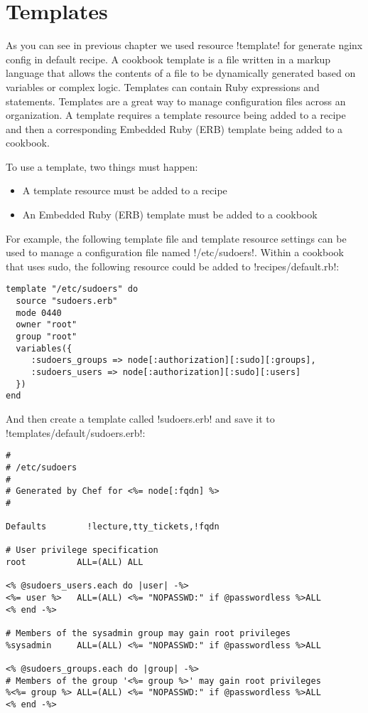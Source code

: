 \section{Templates}
\label{sec:cookbook-templates}

As you can see in previous chapter we used resource \inline!template! for generate nginx config in default recipe. A cookbook template is a file written in a markup language that allows the contents of a file to be dynamically generated based on variables or complex logic. Templates can contain Ruby expressions and statements. Templates are a great way to manage configuration files across an organization. A template requires a template resource being added to a recipe and then a corresponding Embedded Ruby (ERB) template being added to a cookbook.

To use a template, two things must happen:

\begin{itemize}
  \item A template resource must be added to a recipe
  \item An Embedded Ruby (ERB) template must be added to a cookbook
\end{itemize}

For example, the following template file and template resource settings can be used to manage a configuration file named \inline!/etc/sudoers!. Within a cookbook that uses sudo, the following resource could be added to \inline!recipes/default.rb!:

\begin{lstlisting}[label=lst:cookbook-templates1]
template "/etc/sudoers" do
  source "sudoers.erb"
  mode 0440
  owner "root"
  group "root"
  variables({
     :sudoers_groups => node[:authorization][:sudo][:groups],
     :sudoers_users => node[:authorization][:sudo][:users]
  })
end
\end{lstlisting}

And then create a template called \inline!sudoers.erb! and save it to \inline!templates/default/sudoers.erb!:

\begin{lstlisting}[label=lst:cookbook-templates2]
#
# /etc/sudoers
#
# Generated by Chef for <%= node[:fqdn] %>
#

Defaults        !lecture,tty_tickets,!fqdn

# User privilege specification
root          ALL=(ALL) ALL

<% @sudoers_users.each do |user| -%>
<%= user %>   ALL=(ALL) <%= "NOPASSWD:" if @passwordless %>ALL
<% end -%>

# Members of the sysadmin group may gain root privileges
%sysadmin     ALL=(ALL) <%= "NOPASSWD:" if @passwordless %>ALL

<% @sudoers_groups.each do |group| -%>
# Members of the group '<%= group %>' may gain root privileges
%<%= group %> ALL=(ALL) <%= "NOPASSWD:" if @passwordless %>ALL
<% end -%>
\end{lstlisting}

